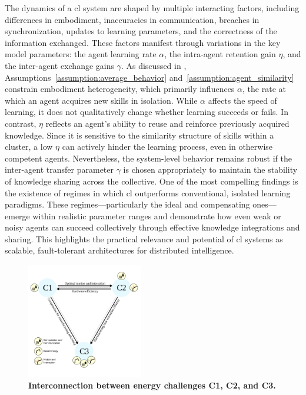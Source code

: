 \documentclass[12pt]{article}
\begin{document}
The dynamics of a \ac{cl} system are shaped by multiple interacting factors, including differences in embodiment, inaccuracies in communication, breaches in synchronization, updates to learning parameters, and the correctness of the information exchanged. These factors manifest through variations in the key model parameters: the agent learning rate $\alpha$, the intra-agent retention gain $\eta$, and the inter-agent exchange gains ${\gamma}$. As discussed in , Assumptions~\ref{assumption:average_behavior} and~\ref{assumption:agent_similarity} constrain embodiment heterogeneity, which primarily influences $\alpha$, the rate at which an agent acquires new skills in isolation. While $\alpha$ affects the speed of learning, it does not qualitatively change whether learning succeeds or fails. In contrast, $\eta$ reflects an agent’s ability to reuse and reinforce previously acquired knowledge. Since it is sensitive to the similarity structure of skills within a cluster, a low $\eta$ can actively hinder the learning process, even in otherwise competent agents. Nevertheless, the system-level behavior remains robust if the inter-agent transfer parameter $\gamma$ is chosen appropriately to maintain the stability of knowledge sharing across the collective. One of the most compelling findings is the existence of regimes in which \ac{cl} outperforms conventional, isolated learning paradigms. These regimes---particularly the ideal and compensating ones---emerge within realistic parameter ranges and demonstrate how even weak or noisy agents can succeed collectively through effective knowledge integrations and sharing. This highlights the practical relevance and potential of \ac{cl} systems as scalable, fault-tolerant architectures for distributed intelligence.

\begin{figure}[!th]
	\centering
	\includegraphics[width=0.45\textwidth]{fig/grand_challenges_connections.png}
	\caption{\textbf{Interconnection between energy challenges C1, C2, and C3.}}
	\label{fig:challengesConnected}
\end{figure}
\end{document}
